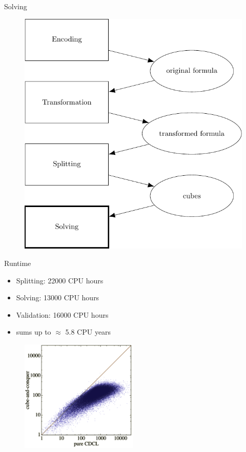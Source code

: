 \documentclass[c,8pt,xcolor...,x11names,usenames,dvipsnames]{beamer}
\begin{document}
\begin{frame}{Solving}
	\begin{figure}
		\includegraphics[scale=0.65]{images/framework4}
	\end{figure}
\end{frame}


\begin{frame}{Runtime}
	\begin{itemize}
		\item Splitting: 22000 CPU hours 
		\item Solving: 13000 CPU hours 
		\item Validation: 16000 CPU hours 
		\item sums up to $\approx$ 5.8 CPU years
	\end{itemize}
	\pause
	\begin{figure}
		\includegraphics[width=0.5\textwidth]{images/plot1.png} 
	\end{figure}
\end{frame}
\end{document}
